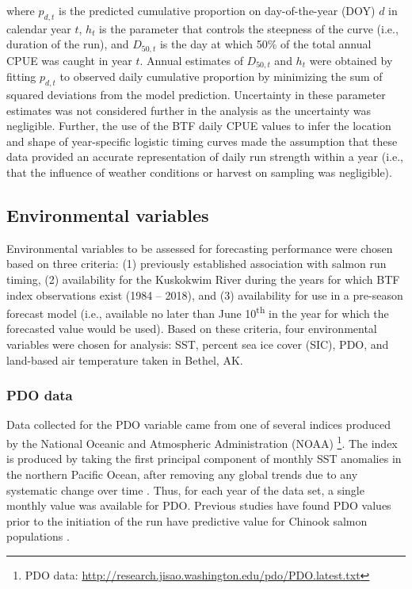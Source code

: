 \documentclass[12pt,]{book}
\let\rmarkdownfootnote\footnote%
\def\footnote{\protect\rmarkdownfootnote}
\theoremstyle{definition}
\theoremstyle{definition}
\theoremstyle{definition}
\theoremstyle{remark}
\begin{document}
\noindent
where \(p_{d,t}\) is the predicted cumulative proportion on
day-of-the-year (DOY) \(d\) in calendar year \(t\), \(h_t\) is the
parameter that controls the steepness of the curve (i.e., duration of
the run), and \(D_{50,t}\) is the day at which 50\% of the total annual
CPUE was caught in year \(t\). Annual estimates of \(D_{50,t}\) and
\(h_t\) were obtained by fitting \(p_{d,t}\) to observed daily
cumulative proportion by minimizing the sum of squared deviations from
the model prediction. Uncertainty in these parameter estimates was not
considered further in the analysis as the uncertainty was negligible.
Further, the use of the BTF daily CPUE values to infer the location and
shape of year-specific logistic timing curves made the assumption that
these data provided an accurate representation of daily run strength
within a year (i.e., that the influence of weather conditions or harvest
on sampling was negligible).

\subsection{Environmental variables}\label{environmental-variables}

\noindent
Environmental variables to be assessed for forecasting performance were
chosen based on three criteria: (1) previously established association
with salmon run timing, (2) availability for the Kuskokwim River during
the years for which BTF index observations exist (1984 -- 2018), and (3)
availability for use in a pre-season forecast model (i.e., available no
later than June 10\textsuperscript{th} in the year for which the
forecasted value would be used). Based on these criteria, four
environmental variables were chosen for analysis: SST, percent sea ice
cover (SIC), PDO, and land-based air temperature taken in Bethel, AK.

\subsubsection{PDO data}\label{pdo-data}

\noindent
Data collected for the PDO variable came from one of several indices
produced by the National Oceanic and Atmospheric Administration (NOAA)
\citep{mantua-etal-1997}\footnote{PDO data:
  \url{http://research.jisao.washington.edu/pdo/PDO.latest.txt}}. The
index is produced by taking the first principal component of monthly SST
anomalies in the northern Pacific Ocean, after removing any global
trends due to any systematic change over time \citep{mantua-etal-1997}.
Thus, for each year of the data set, a single monthly value was
available for PDO. Previous studies have found PDO values prior to the
initiation of the run have predictive value for Chinook salmon
populations \citep{beer-2007, keefer-etal-2008}.
\end{document}
